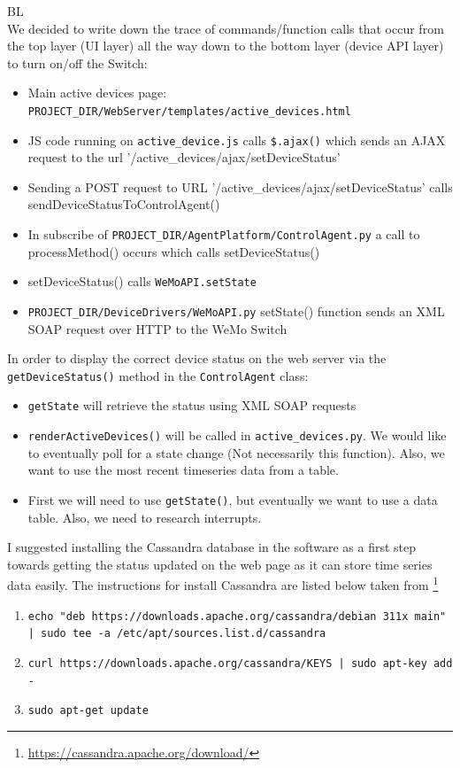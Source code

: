 \documentclass[fontsize=11pt, %
                             paper=letter, %
                             openany, %
                             captions=tableheading,
                             index=totoc,
                             hyperref]{labbook}
\begin{document}

BL\\
We decided to write down the trace of commands/function calls that occur from the top layer (UI layer) all the way down to the bottom layer (device API layer) to turn on/off the Switch:
\begin{itemize}
\item Main active devices page: \texttt{PROJECT\_DIR/WebServer/templates/active\_devices.html}
\item JS code running on \texttt{active\_device.js} calls \texttt{\$.ajax()} which sends an AJAX request to the url '/active\_devices/ajax/setDeviceStatus'
\item Sending a POST request to URL '/active\_devices/ajax/setDeviceStatus' calls sendDeviceStatusToControlAgent()
\item In subscribe of \texttt{PROJECT\_DIR/AgentPlatform/ControlAgent.py} a call to processMethod() occurs which calls setDeviceStatus()
\item setDeviceStatus() calls \texttt{WeMoAPI.setState}
\item \texttt{PROJECT\_DIR/DeviceDrivers/WeMoAPI.py} setState() function sends an XML SOAP request over HTTP to the WeMo Switch
\end{itemize}
In order to display the correct device status on the web server via the \texttt{getDeviceStatus()} method in the \texttt{ControlAgent} class:
\begin{itemize}
\item \texttt{getState} will retrieve the status using XML SOAP requests
\item \texttt{renderActiveDevices()} will be called in \texttt{active\_devices.py}. We would like to eventually poll for a state change (Not necessarily this function). Also, we want to use the most recent timeseries data from a table.
\item First we will need to use \texttt{getState()}, but eventually we want to use a data table. Also, we need to research interrupts. 
\end{itemize}
I suggested installing the Cassandra database in the software as a first step towards getting the status updated on the web page as it can store time series data easily. The instructions for install Cassandra are listed below taken from \footnote{\url{https://cassandra.apache.org/download/}}
\begin{enumerate}
\item \texttt{echo "deb https://downloads.apache.org/cassandra/debian 311x main" | sudo tee -a /etc/apt/sources.list.d/cassandra}
\item \texttt{curl https://downloads.apache.org/cassandra/KEYS | sudo apt-key add -}
\item \texttt{sudo apt-get update}
\end{enumerate}
\end{document}
